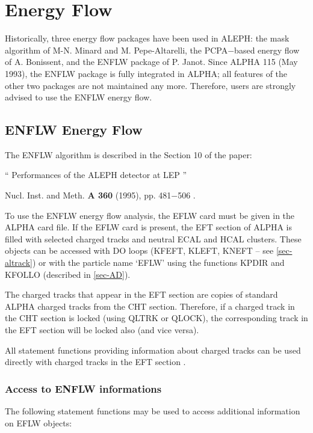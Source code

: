 \chapter{\label{sec-EF}Energy Flow}
\par
Historically, three energy flow packages have been used in ALEPH:  the mask
algorithm of M-N. Minard
and M. Pepe-Altarelli,
the PCPA$-$based energy flow of A. Bonissent, and
the ENFLW package
of P. Janot.
Since ALPHA 115 (May 1993),
the ENFLW package is fully integrated in ALPHA;                             
all features of the other two packages are not maintained any more.
Therefore, users are strongly advised to use the ENFLW energy flow.
\par
\section{\label{sec-EFLWJ}ENFLW Energy Flow}
\par
  The ENFLW algorithm is described in the Section 10 of the paper:
 
   `` Performances of the ALEPH detector at LEP ''
 
  Nucl. Inst. and Meth. {\bf A 360} (1995), pp. 481$-$506 .
 
\par
To use the ENFLW
energy flow analysis, the EFLW card must be given in the ALPHA card
file.
If the EFLW card is present, the EFT section of ALPHA is filled with
selected charged tracks and neutral ECAL and HCAL clusters.
These objects can be accessed
with DO loops
(KFEFT, KLEFT, KNEFT -- see \ref{sec-altrack})
or with the particle name `EFLW' using
the functions KPDIR and KFOLLO (described in
\ref{sec-AD}).


The charged tracks that appear in the EFT section are copies of
standard ALPHA charged tracks from the CHT section.
Therefore, if a charged track in the CHT section is locked (using
QLTRK or QLOCK), the corresponding track in the EFT section will be
locked also (and vice versa).

All statement functions providing information about charged tracks can be used
directly with charged tracks in the EFT section .
 
\subsection{\label{sec-EFLWS}Access to ENFLW informations}

The following statement functions may be used to access
additional information on EFLW objects:
 
